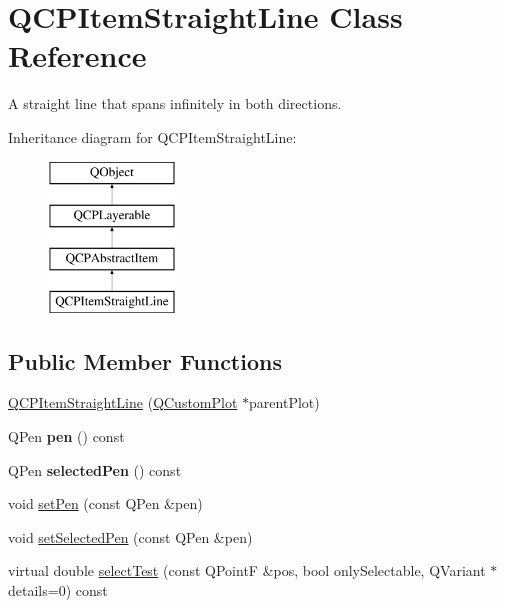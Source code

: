\hypertarget{class_q_c_p_item_straight_line}{}\section{Q\+C\+P\+Item\+Straight\+Line Class Reference}
\label{class_q_c_p_item_straight_line}


A straight line that spans infinitely in both directions.  


Inheritance diagram for Q\+C\+P\+Item\+Straight\+Line\+:\begin{figure}[H]
\begin{center}
\leavevmode
\includegraphics[height=4.000000cm]{class_q_c_p_item_straight_line}
\end{center}
\end{figure}
\subsection*{Public Member Functions}
\begin{DoxyCompactItemize}
\item 
\hyperlink{class_q_c_p_item_straight_line_a41fd2e1f006983449eca9830930c3b10}{Q\+C\+P\+Item\+Straight\+Line} (\hyperlink{class_q_custom_plot}{Q\+Custom\+Plot} $\ast$parent\+Plot)
\item 
\hypertarget{class_q_c_p_item_straight_line_aa751d46cf36073607c11508763f85ff6}{}\label{class_q_c_p_item_straight_line_aa751d46cf36073607c11508763f85ff6} 
Q\+Pen {\bfseries pen} () const
\item 
\hypertarget{class_q_c_p_item_straight_line_ae4a4607045b1d0594f89eee448a31ff9}{}\label{class_q_c_p_item_straight_line_ae4a4607045b1d0594f89eee448a31ff9} 
Q\+Pen {\bfseries selected\+Pen} () const
\item 
void \hyperlink{class_q_c_p_item_straight_line_a9f36c9c9e60d7d9ac084c80380ac8601}{set\+Pen} (const Q\+Pen \&pen)
\item 
void \hyperlink{class_q_c_p_item_straight_line_a5c33559498d33543fa95cf0a36e851ff}{set\+Selected\+Pen} (const Q\+Pen \&pen)
\item 
virtual double \hyperlink{class_q_c_p_item_straight_line_a1e5d99d79efb5871600c72bcd2891a0f}{select\+Test} (const Q\+PointF \&pos, bool only\+Selectable, Q\+Variant $\ast$details=0) const
\end{DoxyCompactItemize}

